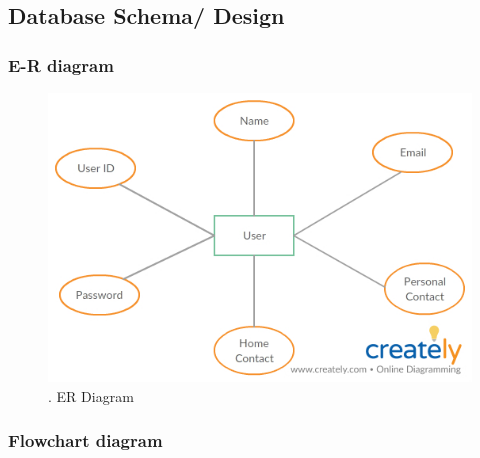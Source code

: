 \documentclass{article}
\begin{document}
\begin{flushleft}
\begin{enumerate}
\begin{center}
\begin{table}[!ht]
\begin{tabular}{ | m{7em} | m{7cm} | }
            \end{tabular}
           \end{table}
           
           \end{center}
            \end{enumerate}
        \newpage
        \subsection{Database Schema/ Design}
            \subsubsection{E-R diagram}
            \begin{figure}[!ht]
              
              \includegraphics[width=12cm]{ER.jpg}
              
              \caption{ .  ER Diagram}
            \end{figure}
            \newpage
            \subsubsection{Flowchart diagram}
             \begin{figure}[!ht]
              

\end{figure}
\end{flushleft}
\end{document}
